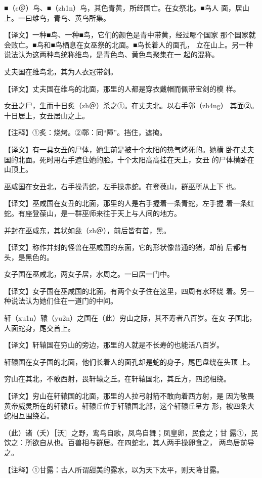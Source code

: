 \documentclass[a4paper,12pt,UTF8,twoside]{ctexbook}
\begin{document}
■（c＠）鸟、■（zh1n）鸟，其色青黄，所经国亡。在女祭北。■鸟人 面，居山上。一曰维鸟，青鸟、黄鸟所集。

【译文】一种■鸟、一种■鸟，它们的颜色是青中带黄，经过哪个国家 那个国家就会败亡。■鸟和■鸟栖息在女巫祭的北面。■鸟长着人的面孔， 立在山上。另一种说法认为这两种鸟统称维鸟，是青色鸟、黄色鸟聚集在一 起的混称。

丈夫国在维鸟北，其为人衣冠带剑。

【译文】丈夫国在维鸟的北面，那里的人都是穿衣戴帽而佩带宝剑的模 样。

女丑之尸，生而十日炙（zh＠）杀之①。在丈夫北。以右手鄣（zh4ng） 其面②。十日居上，女丑居山之上。

【注释】①炙：烧烤。②鄣：同“障”。挡住，遮掩。

【译文】有一具女丑的尸体，她生前是被十个太阳的热气烤死的。她横 卧在丈夫国的北面。死时用右手遮住她的脸。十个太阳高高挂在天上，女丑 的尸体横卧在山顶上。

巫咸国在女丑北，右手操青蛇，左手操赤蛇。在登葆山，群巫所从上下 也。

【译文】巫咸国在女丑的北面，那里的人是右手握着一条青蛇，左手握 着一条红蛇。有座登葆山，是一群巫师来往于天上与人间的地方。

并封在巫咸东，其状如彘（zh＠），前后皆有首，黑。

【译文】称作并封的怪兽在巫咸国的东面，它的形状像普通的猪，却前 后都有头，是黑色的。

女子国在巫咸北，两女子居，水周之。一曰居一门中。

【译文】女子国在巫咸国的北面，有两个女子住在这里，四周有水环绕 着。另一种说法认为她们住在一道门的中间。

轩（xu1n）辕（yu2n）之国在（此）穷山之际，其不寿者八百岁。在女 子国北，人面蛇身，尾交首上。

【译文】轩辕国在穷山的旁边，那里的人就是不长寿的也能活八百岁。

轩辕国在女子国的北面，他们长着人的面孔却是蛇的身子，尾巴盘绕在头顶 上。

穷山在其北，不敢西射，畏轩辕之丘。在轩辕国北，其丘方，四蛇相绕。

【译文】穷山在轩辕国的北面，那里的人拉弓射箭不敢向着西方射，是 因为敬畏黄帝威灵所在的轩辕丘。轩辕丘位于轩辕国北部，这个轩辕丘呈方 形，被四条大蛇相互围绕着。

（此）诸（夭）［沃］之野，鸾鸟自歌，凤鸟自舞；凤皇卵，民食之；甘 露①，民饮之：所欲自从也。百兽相与群居。在四蛇北，其人两手操卵食之， 两鸟居前导之。

【注释】①甘露：古人所谓甜美的露水，以为天下太平，则天降甘露。
\end{document}

